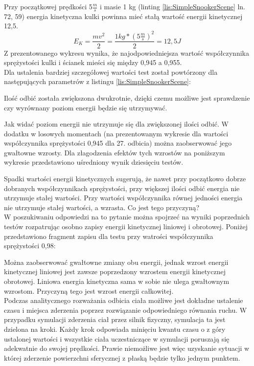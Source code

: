 

Przy początkowej prędkości 5$\frac{m}{s}$ i masie 1 kg (linting
\ref{lis:SimpleSnookerScene} ln. 72, 59) energia kinetyczna kulki powinna mieć
stałą wartość energii kinetycznej 12,5.
\begin{equation}
E_{K} = \frac{mv^{2}}{2} = \frac{1kg*(5\frac{m}{s})^{2}}{2} =
12,5J
\end{equation}
Z prezentowanego wykresu wynika, że najodpowiedniejsza wartość współczynnika
sprężystości kulki i ścianek mieści się między 0,945 a 0,955.\\
Dla ustalenia bardziej szczegółowej wartości test został powtórzony dla
następujących parametrów z listingu \ref{lis:SimpleSnookerScene}:


  
Ilość odbić została zwiększona dwukrotnie, dzięki czemu możliwe jest sprawdzenie
czy wyrównany poziom energii będzie się utrzymywać.
  


Jak widać poziom energii nie utrzymuje się dla zwiększonej ilości odbić. W
dodatku w losowych momentach (na prezentowanym wykresie dla wartości
współczynnika sprężystości 0,945 dla 27. odbicia) można zaobserwować jego
gwałtowne wzrosty. Dla złagodzenia efektów tych wzrostów na poniższym wykresie
przedstawiono uśredniony wynik dziesięciu testów.



Spadki wartości energii kinetycznych sugerują, że nawet przy początkowo dobrze
dobranych współczynnikach sprężystości, przy większej ilości odbić energia nie
utrzymuje stałej wartości. Przy wartości współczynnika równej jedności energia
nie utrzymuje stałej wartości, a wzrasta. Co jest tego przyczyną? \\
W poszukiwaniu odpowiedzi na to pytanie można spojrzeć na wyniki poprzednich
testów rozpatrując osobno zapisy energii kinetycznej liniowej i obrotowej.
Poniżej przedstawiono fragment zapisu dla testu przy watrości współczynnika
sprężystości 0,98:


  
Można zaobserwować gwałtowne zmiany obu energii, jednak wzrost energii
kinetycznej liniowej jest zawsze poprzedzony wzrostem energii kinetycznej
obrotowej. Liniowa energia kinetyczna sama w sobie nie ulega gwałtownym
wzrostom. Przyczyną tego jest wzrost energii całkowitej.\\
Podczas analitycznego rozważania odbicia ciała możliwe jest dokładne ustalenie
czasu i miejsca zderzenia poprzez rozwiązanie odpowiedniego równania ruchu. W
przypadku symulacji zderzenia ciał przez silnik fizyczny, symulacja ta jest
dzielona na kroki. Każdy krok odpowiada minięciu kwantu czasu o z góry ustalonej
wartości i wszystkie ciała uczestniczące w symulacji poruszają się adekwatnie do
swojej prędkości. Prawie niemożliwe jest więc uzyskanie sytuacji w której
zderzenie powierzchni sferycznej z płaską będzie tylko jednym punktem.

